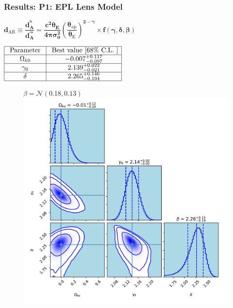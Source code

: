 \documentclass[xcolor=table,bigger]{beamer}
\begin{document}
\begin{frame}
 \frametitle{Results: \textbf{ P1: EPL} Lens Model}
\begin{scriptsize}
$
{\boxed{\boldsymbol{d_{\mathrm{AR}} \equiv \dfrac{d_{A}^{^{ls}}}{d_{A}^{^{os}}}=\dfrac{c^{2} \theta_{E}}{4 \pi \sigma_{0}^{2}}\left(\dfrac{\theta_{\mathrm{ap}}}{\theta_{\mathrm{E}}}\right)^{2-\gamma} \times f(\gamma, \delta, \beta)}}}
$
\end{scriptsize} {\scriptsize $\begin{array}{|c|c|}\hline \text { Parameter } & {\text { Best value }[68 \% \text { C.L. }]} \\ \hline \Omega_{k 0} & {-0.007^{+0.117}_{-0.097}} \\ \hline \gamma_{0} & {2.139^{+0.022}_{-0.021}} \\ \hline \delta & {2.265^{+0.146}_{-0.194}} \\ \hline\end{array}$}
\begin{figure}[ht!]
$\beta=\mathcal{N}\left(0.18,0.13\right)$
\centering
\includegraphics[width=58 mm]{distance_Ratio_161_ok_1_ga_delt_corner_P1_without_beta_h0_dec}
\end{figure} 
\end{frame}
\end{document}
